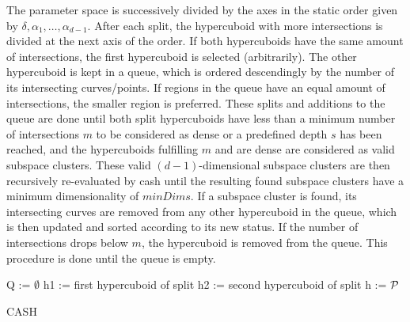 The parameter space is successively divided by the axes in the static order given by $\delta,\alpha_1,\dotsc,\alpha_{d-1}$. After each split, the hypercuboid with more intersections is divided at the next axis of the order. If both hypercuboids have the same amount of intersections, the first hypercuboid is selected (arbitrarily). The other hypercuboid is kept in a queue, which is ordered descendingly by the number of its intersecting curves/points. If regions in the queue have an equal amount of intersections, the smaller region is preferred. These splits and additions to the queue are done until both split hypercuboids have less than a minimum number of intersections $m$ to be considered as dense or a predefined depth $s$ has been reached, and the hypercuboids fulfilling $m$ and are dense are considered as valid subspace clusters. These valid $(d-1)$-dimensional subspace clusters are then recursively re-evaluated by \gls{cash} until the resulting found subspace clusters have a minimum dimensionality of $minDims$. If a subspace cluster is found, its intersecting curves are removed from any other hypercuboid in the queue, which is then updated and sorted according to its new status. If the number of intersections drops below $m$, the hypercuboid is removed from the queue. This procedure is done until the queue is empty.

\vspace{5mm}
\begin{algorithm}[H]
\SetAlgoLined
{}
Q := $\emptyset$\;     
h1 := first hypercuboid of split\;
h2 := second hypercuboid of split\;
h := $\mathcal{P}$

 \caption{CASH}
\end{algorithm}
\vspace{5mm}

